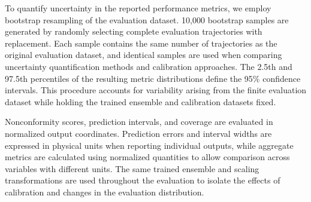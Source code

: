 To quantify uncertainty in the reported performance metrics, we employ bootstrap resampling of the evaluation dataset. 10,000 bootstrap samples are generated by randomly selecting complete evaluation trajectories with replacement. Each sample contains the same number of trajectories as the original evaluation dataset, and identical samples are used when comparing uncertainty quantification methods and calibration approaches. The 2.5th and 97.5th percentiles of the resulting metric distributions define the 95\% confidence intervals. This procedure accounts for variability arising from the finite evaluation dataset while holding the trained ensemble and calibration datasets fixed.

Nonconformity scores, prediction intervals, and coverage are evaluated in normalized output coordinates. Prediction errors and interval widths are expressed in physical units when reporting individual outputs, while aggregate metrics are calculated using normalized quantities to allow comparison across variables with different units. The same trained ensemble and scaling transformations are used throughout the evaluation to isolate the effects of calibration and changes in the evaluation distribution.
